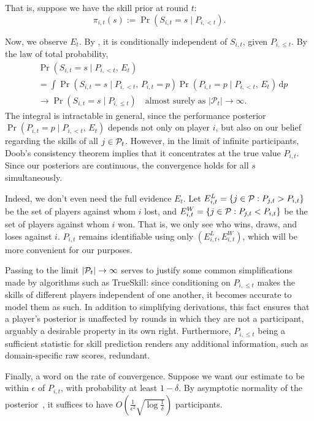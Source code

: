 That is, suppose we have the skill prior at round $t$:
\begin{equation}
\label{eq:pi-s}
\pi_{i,t}(s) := \Pr(S_{i,t} = s \mid P_{i,<t}).
\end{equation}

Now, we observe $E_t$. By , it is conditionally independent of $S_{i,t}$, given $P_{i,\le t}$. By the law of total probability,
\begin{align*}
&\Pr(S_{i,t}=s \mid P_{i,<t},\,E_t)
\\&= \int \Pr(S_{i,t}=s \mid P_{i,<t},\,P_{i,t}=p) \Pr(P_{i,t}=p \mid P_{i,<t},\,E_t) \, \mathrm{d}p
\\&\rightarrow \Pr(S_{i,t}=s \mid P_{i,\le t}) \quad\text{almost surely as }|\mathcal P_t|\rightarrow\infty.
\end{align*}
The integral is intractable in general, since the performance posterior $\Pr(P_{i,t}=p \mid P_{i,<t},\,E_t)$ depends not only on player $i$, but also on our belief regarding the skills of all $j\in\mathcal{P}_t$. However, in the limit of infinite participants, Doob's consistency theorem \cite{F63} implies that it concentrates at the true value $P_{i,t}$. Since our posteriors are continuous, the convergence holds for all $s$ simultaneously.

Indeed, we don't even need the full evidence $E_t$. Let $E^L_{i,t} = \{j\in\mathcal{P}:P_{j,t}>P_{i,t}\}$ be the set of players against whom $i$ lost, and $E^W_{i,t} = \{j\in\mathcal{P}:P_{j,t}<P_{i,t}\}$ be the set of players against whom $i$ won. That is, we only see who wins, draws, and loses against $i$. $P_{i,t}$ remains identifiable using only $(E^L_{i,t}, E^W_{i,t})$, which will be more convenient for our purposes.

Passing to the limit $|\mathcal{P}_t|\rightarrow\infty$ serves to justify some common simplifications made by algorithms such as TrueSkill: since conditioning on $P_{i,\le t}$ makes the skills of different players independent of one another, it becomes accurate to model them as such. In addition to simplifying derivations, this fact ensures that a player's posterior is unaffected by rounds in which they are not a participant, arguably a desirable property in its own right. Furthermore, $P_{i,\le t}$ being a sufficient statistic for skill prediction renders any additional information, such as domain-specific raw scores, redundant.

Finally, a word on the rate of convergence. Suppose we want our estimate to be within $\epsilon$ of $P_{i,t}$, with probability at least $1-\delta$. By asymptotic normality of the posterior~\cite{F63}, it suffices to have $O(\frac 1{\epsilon^2}\sqrt{\log \frac 1\delta})$ participants.

